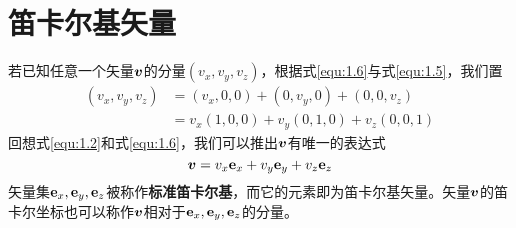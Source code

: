 \section{笛卡尔基矢量}
若已知任意一个矢量$\bb{v}$的分量$(v_x,v_y,v_z)$，根据式\eqref{equ:1.6}与式\eqref{equ:1.5}，我们置
\begin{equation}\label{equ:1.15}
    \begin{aligned}
        \left( v_x,v_y,v_z \right) &=\left( v_x,0,0 \right) +\left( 0,v_y,0 \right) +\left( 0,0,v_z \right)\\
        &=v_x\left( 1,0,0 \right) +v_y\left( 0,1,0 \right) +v_z\left( 0,0,1 \right)
    \end{aligned}
\end{equation}
回想式\eqref{equ:1.2}和式\eqref{equ:1.6}，我们可以推出$\bb{v}$有唯一的表达式
\begin{equation}\label{equ:1.16}
    \bb{v}=v_x\bf{e}_x+v_y\bf{e}_y+v_z\bf{e}_z
\end{equation}
矢量集${\bf{e}_x,\bf{e}_y,\bf{e}_z}$被称作\textbf{标准笛卡尔基}，而它的元素即为笛卡尔基矢量。矢量$\bb{v}$的笛卡尔坐标也可以称作$\bb{v}$相对于${\bf{e}_x,\bf{e}_y,\bf{e}_z}$的分量。